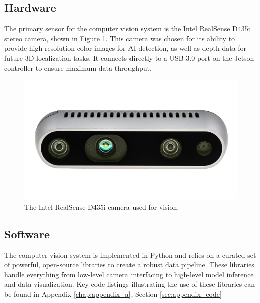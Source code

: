 \subsection{Hardware}
The primary sensor for the computer vision system is the Intel RealSense D435i stereo camera, shown in Figure \ref{fig:realsense_camera}. This camera was chosen for its ability to provide high-resolution color images for AI detection, as well as depth data for future 3D localization tasks. It connects directly to a USB 3.0 port on the Jetson controller to ensure maximum data throughput.

\begin{figure}[h!]
    \centering
    \includegraphics[width=0.6\linewidth]{figures/camera.png}
    \caption{The Intel RealSense D435i camera used for vision.}
    \label{fig:realsense_camera}
\end{figure}

\subsection{Software}
\label{ssec:cv_software}
The computer vision system is implemented in Python and relies on a curated set of powerful, open-source libraries to create a robust data pipeline. These libraries handle everything from low-level camera interfacing to high-level model inference and data visualization. Key code listings illustrating the use of these libraries can be found in Appendix \ref{chap:appendix_a}, Section \ref{sec:appendix_code}

